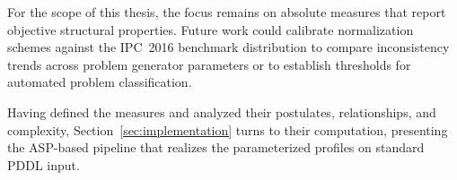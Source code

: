 For the scope of this thesis, the focus remains on absolute measures that report objective structural properties. Future work could calibrate normalization schemes against the \ac{IPC}~2016 benchmark distribution to compare inconsistency trends across problem generator parameters or to establish thresholds for automated problem classification.

Having defined the measures and analyzed their postulates, relationships, and complexity, Section~\ref{sec:implementation} turns to their computation, presenting the \ac{ASP}-based pipeline that realizes the parameterized profiles on standard \ac{PDDL} input.
